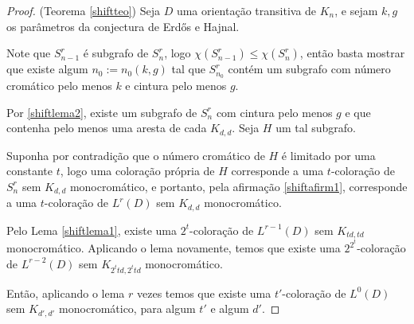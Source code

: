 \begin{proof}(Teorema \ref{shiftteo})
Seja $D$ uma orientação transitiva de $K_n$, e sejam $k,g$ os parâmetros da conjectura de Erd\H{o}s e Hajnal. %

Note que $S_{n-1}^r$ é subgrafo de $S_n^r$, logo $\chi(S_{n-1}^r) \leq \chi(S_n^r)$, então basta mostrar que existe algum $n_0 := n_0(k,g)$ tal que $S_{n_0}^r$ contém um subgrafo com número cromático pelo menos $k$ e cintura pelo menos $g$.

Por \ref{shiftlema2}, existe um subgrafo de $S_n^r$ com cintura pelo menos $g$ e que contenha pelo menos uma aresta de cada $K_{d,d}$. Seja $H$ um tal subgrafo.

Suponha por contradição que o número cromático de $H$ é limitado por uma constante $t$, logo uma coloração própria de $H$ corresponde a uma $t$-coloração de $S_n^r$ sem $K_{d,d}$ monocromático, e portanto, pela afirmação \ref{shiftafirm1}, corresponde a uma $t$-coloração de $L^r(D)$ sem $K_{d,d}$ monocromático.

Pelo Lema \ref{shiftlema1}, existe uma $2^t$-coloração de $L^{r-1}(D)$ sem $K_{td,td}$ monocromático. Aplicando o lema novamente, temos que existe uma $2^{2^t}$-coloração de $L^{r-2}(D)$ sem $K_{2^ttd,2^ttd}$ monocromático.

Então, aplicando o lema $r$ vezes temos que existe uma $t'$-coloração de $L^0(D)$ sem $K_{d',d'}$ monocromático, para algum $t'$ e algum $d'$. 


\end{proof}
